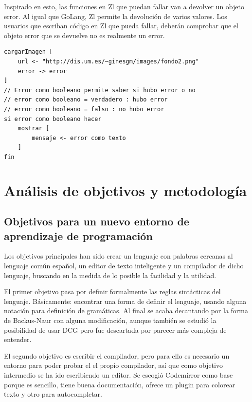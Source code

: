 \documentclass{report}
\begin{document}
	\vspace{10px}
	
	Inspirado en esto, las funciones en Zl que puedan fallar van a devolver un objeto error. Al igual que GoLang, Zl permite la devolución de varios valores. Los usuarios que escriban código en Zl que pueda fallar, deberán comprobar que el objeto error que se devuelve no es realmente un error. 

	\vspace{10px}	

	\begin{BVerbatim}	
cargarImagen [
	url <- "http://dis.um.es/~ginesgm/images/fondo2.png"
	error -> error
]
// Error como booleano permite saber si hubo error o no
// error como booleano = verdadero : hubo error
// error como booleano = falso : no hubo error
si error como booleano hacer 
	mostrar [
		mensaje <- error como texto
	]
fin
	\end{BVerbatim}
	
	\chapter{Análisis de objetivos y metodología}
	
	\section{Objetivos para un nuevo entorno de aprendizaje de programación}
	
	Los objetivos principales han sido crear un lenguaje con palabras cercanas al lenguaje común español, un editor de texto inteligente y un compilador de dicho lenguaje, buscando en la medida de lo posible la facilidad y la utilidad. 
	
	\vspace{10px}
	
	El primer objetivo pasa por definir formalmente las reglas sintácticas del lenguaje. Básicamente: encontrar una forma de definir el lenguaje, usando alguna notación para definición de gramáticas. Al final se acaba decantando por la forma de Backus-Naur\cite{bnf} con alguna modificación, aunque también se estudió la posibilidad de usar DCG\cite{dcg} pero fue descartada por parecer más compleja de entender. 
	
	\vspace{10px}

	El segundo objetivo es escribir el compilador, pero para ello es necesario un entorno para poder probar el el propio compilador, así que como objetivo intermedio se ha ido escribiendo un editor. Se escogió Codemirror como base porque es sencillo, tiene buena documentación, ofrece un plugin para colorear texto\cite{codemirrorsyntaxhighlight} y otro para autocompletar\cite{codemirrorautocomplete}. 
	
\end{document}

